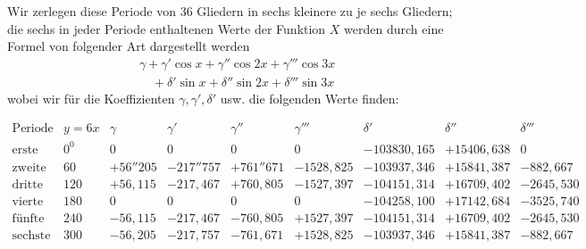 Wir zerlegen diese Periode von \(36\) Gliedern in sechs kleinere zu je sechs Gliedern; die sechs in jeder Periode enthaltenen Werte der Funktion \(X\) werden durch eine Formel von folgender Art dargestellt werden
\[
\begin{aligned}
&\gamma+\gamma'\cos x+\gamma''\cos 2x+\gamma'''\cos 3x\\[6pt]
&\quad+\delta'\sin x+\delta''\sin 2x+\delta'''\sin 3x
\end{aligned}
\]
wobei wir für die Koeffizienten \(\gamma,\gamma',\delta'\) usw. die folgenden Werte finden:


\begin{landscape}\thispagestyle{empty}\begingroup\fontsize{9}{12}\selectfont\setlength{\arraycolsep}{3pt}\renewcommand{\arraystretch}{1.3}
\[
\begin{array}{l|r|r|r|r|r|r|r|r}
\text{Periode}&y=6x&\gamma&\gamma'&\gamma''&\gamma'''&\delta'&\delta''&\delta'''\\ \hline
\text{erste}&0^{\mathord{0}}&0&0&0&0&
-103830{,}165&
+15406{,}638&0\\
\text{zweite}&60&+56''205&-217''757&+761''671&-1528{,}825&-103937{,}346&+15841{,}387&-882{,}667\\
\text{dritte}&120&+56{,}115&-217{,}467&+760{,}805&-1527{,}397&-104151{,}314&+16709{,}402&-2645{,}530\\
\text{vierte}&180&0&0&0&0&-104258{,}100&+17142{,}684&-3525{,}740\\
\text{fünfte}&240&-56{,}115&-217{,}467&-760{,}805&+1527{,}397&-104151{,}314&+16709{,}402&-2645{,}530\\
\text{sechste}&300&-56{,}205&-217{,}757&-761{,}671&+1528{,}825&-103937{,}346&+15841{,}387&-882{,}667
\end{array}
\]
\endgroup\end{landscape}


